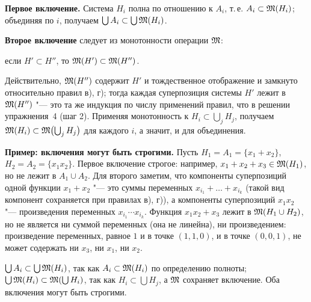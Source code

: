 \begin{solution}[5 (\S\,4)]
\textbf{Первое включение.} Система $H_i$ полна по отношению к $A_i$, т.\,е.
$A_i\subset\mathfrak M(H_i)$; объединяя по $i$, получаем
$\bigcup A_i\subset\bigcup\mathfrak M(H_i)$.

\textbf{Второе включение} следует из монотонности операции $\mathfrak M$:
\begin{keystmt}
если $H'\subset H''$, то $\mathfrak M(H')\subset\mathfrak M(H'')$.
\end{keystmt}
Действительно, $\mathfrak M(H'')$ содержит $H'$ и тождественное отображение и
замкнуто относительно правил в), г); тогда каждая суперпозиция системы $H'$
лежит в $\mathfrak M(H'')$ "--- это та же индукция по числу применений правил,
что в решении упражнения~4 (шаг 2). Применяя монотонность к
$H_i\subset\bigcup_jH_j$, получаем $\mathfrak M(H_i)\subset\mathfrak M\bigl(\bigcup_jH_j\bigr)$
для каждого $i$, а значит, и для объединения.

\textbf{Пример: включения могут быть строгими.} Пусть $H_1=A_1=\{x_1+x_2\}$,
$H_2=A_2=\{x_1x_2\}$. Первое включение строгое: например,
$x_1+x_2+x_3\in\mathfrak M(H_1)$, но не лежит в $A_1\cup A_2$. Для второго заметим, что
компоненты суперпозиций одной функции $x_1+x_2$ "--- это суммы переменных
$x_{i_1}+\dots+x_{i_k}$ (такой вид компонент сохраняется при правилах в), г)),
а компоненты суперпозиций $x_1x_2$ "--- произведения переменных
$x_{i_1}\cdots x_{i_k}$.
Функция $x_1x_2+x_3$ лежит в $\mathfrak M(H_1\cup H_2)$, но не является ни суммой
переменных (она не линейна), ни произведением: произведение переменных,
равное $1$ и в точке $(1,1,0)$, и в точке $(0,0,1)$, не может содержать ни
$x_3$, ни $x_1$, ни $x_2$.

\answer $\bigcup A_i\subset\bigcup\mathfrak M(H_i)$, так как $A_i\subset\mathfrak M(H_i)$ по
определению полноты; $\bigcup\mathfrak M(H_i)\subset\mathfrak M(\bigcup H_i)$, так как
$H_i\subset\bigcup H_j$, а $\mathfrak M$ сохраняет включение. Оба включения могут
быть строгими.
\end{solution}

